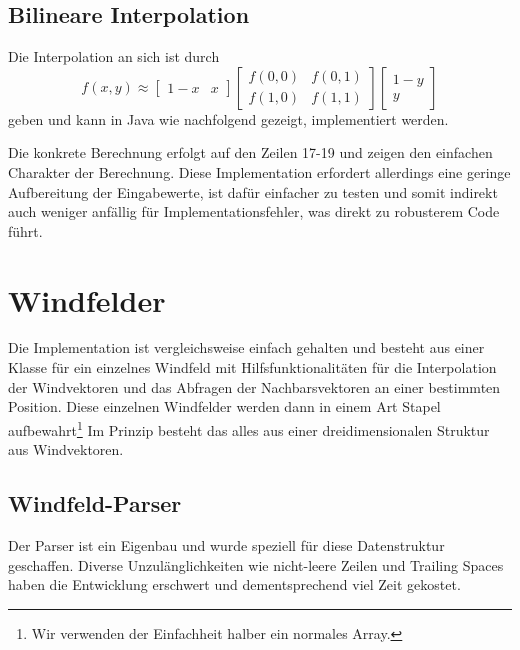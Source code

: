 \subsection{Bilineare Interpolation}\label{sss:bilinearinterpolation}
Die Interpolation an sich ist durch 
\begin{equation}
f(x,y) \approx \begin{bmatrix} 1-x & x \end{bmatrix} \begin{bmatrix}
f(0,0) & f(0,1) \\ f(1,0) & f(1,1) \end{bmatrix} \begin{bmatrix} 1 - y
\\ y \end{bmatrix}
\label{eq:bilineareinterpolation}
\end{equation}
geben und kann in Java wie nachfolgend gezeigt, implementiert werden.

 
Die konkrete Berechnung erfolgt auf den Zeilen 17-19 und zeigen den einfachen
Charakter der Berechnung. Diese Implementation erfordert allerdings eine
geringe Aufbereitung der Eingabewerte, ist dafür einfacher zu testen und somit
indirekt auch weniger anfällig für Implementationsfehler, was direkt zu
robusterem Code führt.

\section{Windfelder}
Die Implementation ist vergleichsweise einfach gehalten und besteht aus einer
Klasse für ein einzelnes Windfeld mit Hilfsfunktionalitäten für die
Interpolation der Windvektoren und das Abfragen der Nachbarsvektoren an einer
bestimmten Position. Diese einzelnen Windfelder werden dann in einem Art Stapel
aufbewahrt\footnote{Wir verwenden der Einfachheit halber ein normales Array.}
Im Prinzip besteht das alles aus einer dreidimensionalen Struktur aus
Windvektoren.

\subsection{Windfeld-Parser}
Der Parser ist ein Eigenbau und wurde speziell für diese Datenstruktur
geschaffen. Diverse Unzulänglichkeiten wie nicht-leere Zeilen und Trailing
Spaces haben die Entwicklung erschwert und dementsprechend viel Zeit gekostet.

